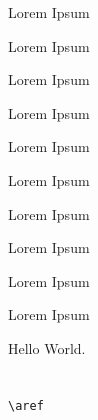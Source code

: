 \documentclass[11pt,dutch]{article}
\begin{document}
    \label{art:agreement}
    \begin{leden}
        \item \label{lid:lorem} Lorem Ipsum
        \item \label{lid:lorem2} Lorem Ipsum
        \item \label{lid:lorem3} Lorem Ipsum
        \item \label{lid:lorem4} Lorem Ipsum
        \item \label{lid:lorem5} Lorem Ipsum
        \begin{leden}
            \item \label{sub:lorem} Lorem Ipsum
            \item \label{sub:lorem2} Lorem Ipsum
            \item \label{sub:lorem3} Lorem Ipsum
            \item \label{sub:lorem4} Lorem Ipsum
            \item \label{sub:lorem5} Lorem Ipsum
        \end{leden}
    \end{leden}
    Hello World. \\
    \\
    \newpage
    \\
    \verb|\aref|\\
    \\
    \\
    \\
    \\
    \\
    \\
\end{document}
